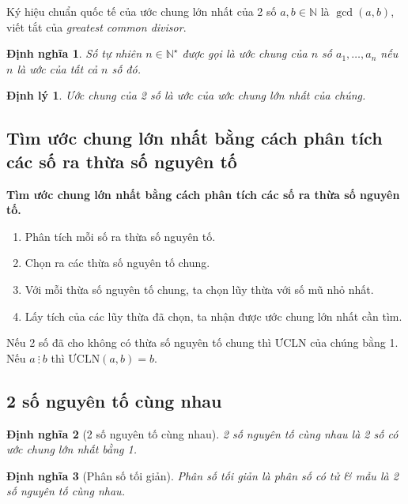\documentclass[oneside]{book}
\numberwithin{equation}{section}
\newtheorem{dinhnghia}{Định nghĩa}[section]
\newtheorem{dinhly}{Định lý}[section]
\begin{document}
Ký hiệu chuẩn quốc tế của ước chung lớn nhất của 2 số $a,b\in\mathbb{N}$ là $\gcd(a,b)$, viết tắt của \textit{greatest common divisor}.

\begin{dinhnghia}
	Số tự nhiên $n\in\mathbb{N}^\star$ được gọi là \emph{ước chung} của $n$ số $a_1,\ldots,a_n$ nếu $n$ là ước của tất cả $n$ số đó.
\end{dinhnghia}

\begin{dinhly}
	Ước chung của 2 số là ước của ước chung lớn nhất của chúng.
\end{dinhly}

\subsection{Tìm ước chung lớn nhất bằng cách phân tích các số ra thừa số nguyên tố}
\begin{tcolorbox}
	\textbf{Tìm ước chung lớn nhất bằng cách phân  tích các số ra thừa số nguyên tố.}
	\begin{enumerate}
		\item Phân tích mỗi số ra thừa số nguyên tố.
		\item Chọn ra các thừa số nguyên tố chung.
		\item Với mỗi thừa số nguyên tố chung, ta chọn lũy thừa với số mũ nhỏ nhất.
		\item Lấy tích của các lũy thừa đã chọn, ta nhận được ước chung lớn nhất cần tìm.
	\end{enumerate}
\end{tcolorbox}
Nếu 2 số đã cho không có thừa số nguyên tố chung thì ƯCLN của chúng bằng 1. Nếu $a\ \vdots\ b$ thì $\mbox{ƯCLN}(a,b) = b$.

\subsection{2 số nguyên tố cùng nhau}

\begin{dinhnghia}[2 số nguyên tố cùng nhau]
	\emph{2 số nguyên tố cùng nhau} là 2 số có ước chung lớn nhất bằng 1.
\end{dinhnghia}

\begin{dinhnghia}[Phân số tối giản]
	\emph{Phân số tối giản} là phân số có tử \textit{\&} mẫu là 2 số nguyên tố cùng nhau.
\end{dinhnghia}
\end{document}
